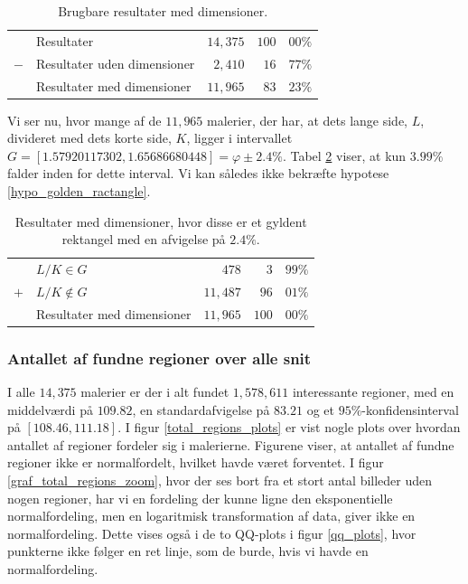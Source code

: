 {\begin{table}[H]
    \centering
    \begin{tabular}{r@{\ \ }p{14em}r|r@{.}l}
            & Resultater                     & $14,375$ & $100$ & $00\%$ \\
        $-$ & Resultater uden dimensioner    &  $2,410$ &  $16$ & $77\%$ \\\hline
            & Resultater med dimensioner     & $11,965$ &  $83$ & $23\%$
    \end{tabular}
    \caption[]{Brugbare resultater med dimensioner.}
    \label{tabel_med_dimensioner}
\end{table}

Vi ser nu, hvor mange af de $11,965$ malerier, der har, at dets lange
side, $L$, divideret med dets korte side, $K$, ligger i intervallet $G =
[1.57920117302, 1.65686680448] = \varphi \pm 2.4\%$. Tabel
\ref{tabel_real_dimensions} viser, at kun $3.99\%$ falder inden for
dette interval. Vi kan således ikke bekræfte hypotese
\ref{hypo_golden_ractangle}.

\begin{table}[H]
    \centering
    \begin{tabular}{r@{\ \ }p{14em}r|r@{.}l}
            & $L/K \in G$                  &    $478$ &   $3$ & $99\%$ \\
        $+$ & $L/K \notin G$               & $11,487$ &  $96$ & $01\%$ \\\hline
            & Resultater med dimensioner   & $11,965$ & $100$ & $00\%$
    \end{tabular}
    \caption[]{Resultater med dimensioner, hvor disse er et gyldent
    rektangel med en afvigelse på $2.4\%$.}
    \label{tabel_real_dimensions}
\end{table}

\subsubsection{Antallet af fundne regioner over alle snit}
I alle $14,375$ malerier er der i alt fundet $1,578,611$ interessante
regioner, med en middelværdi på $109.82$, en standardafvigelse på
$83.21$ og et $95\%$-konfidensinterval på $[108.46, 111.18]$. I figur
\ref{total_regions_plots} er vist nogle plots over hvordan antallet af
regioner fordeler sig i malerierne. Figurene viser, at antallet af
fundne regioner ikke er normalfordelt, hvilket havde været forventet.
I figur \ref{graf_total_regions_zoom}, hvor der ses bort fra et stort
antal billeder uden nogen regioner, har vi en fordeling der kunne ligne
den eksponentielle normalfordeling, men en logaritmisk transformation af
data, giver ikke en normalfordeling. Dette vises også i de to QQ-plots i
figur \ref{qq_plots}, hvor punkterne ikke følger en ret linje, som de
burde, hvis vi havde en normalfordeling.

}

